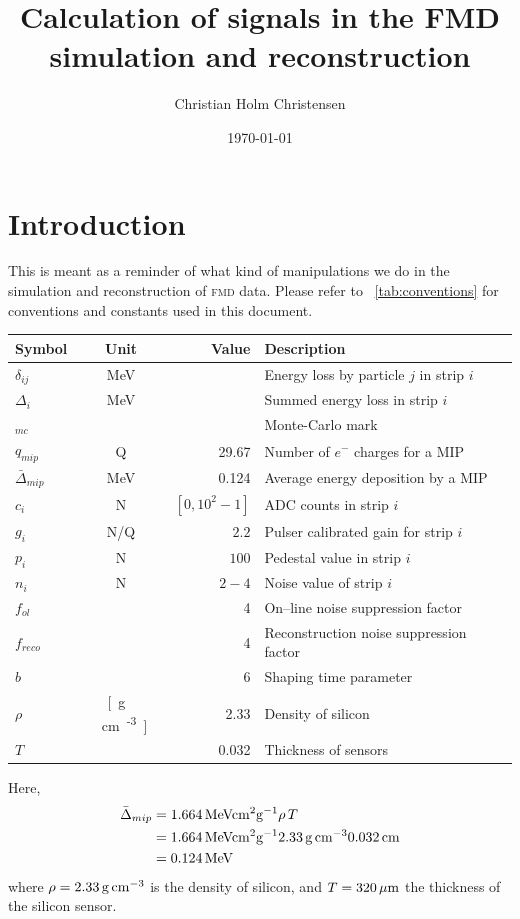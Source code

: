 \documentclass[11pt]{article}
\title{Calculation of signals in the FMD simulation and reconstruction}
\author{Christian Holm Christensen}
\date{\today}
\def\MeV#1{\unit[#1]{MeV}}
\def\N#1{\unit[#1]{N}}
\def\Q#1{\unit[#1]{Q}}
\def\FMD{{\scshape fmd}}
\def\DeltaMip{\ensuremath{\bar{\Delta}_{mip}}}
\begin{document}
\maketitle 

\section*{Introduction}

This is meant as a reminder of what kind of manipulations we do in the
simulation and reconstruction of \FMD{} data.   Please refer to
\tablename~\ref{tab:conventions} for conventions and constants used in
this document. 

\begin{table}[Htbp]
  \begingroup
  \centering
  \begin{tabular}{|l|c|r|p{}|}
    \hline
    \textbf{Symbol} & \textbf{Unit} & \textbf{Value} & \textbf{Description}\\
    \hline
    $\delta_{ij}$  & \MeV{}    &  & Energy loss by particle $j$ in strip $i$\\ 
    $\Delta_i$     & \MeV{}    &  & Summed energy loss in strip $i$\\
    ${}_{mc}$      &           &  & Monte-Carlo mark\\ 
    $q_{mip}$      & \Q{}       & 29.67 & Number of $e^-$ charges for a MIP\\
    $\DeltaMip{}$ & \MeV{}    & 0.124 & Average energy deposition by a MIP\\
    $c_i$          & \N{}      &  $[0,10^2-1]$ & ADC counts in strip $i$\\
    $g_i$          & \N{}/\Q{} & $~2.2$ & Pulser calibrated gain for strip $i$\\
    $p_i$          & \N{}      & $~100$ & Pedestal value in strip $i$\\
    $n_i$          & \N{}      & $2-4$ & Noise value of strip $i$\\
    $f_{ol}$       &           & 4 & On--line noise suppression factor\\
    $f_{reco}$     &            & 4 & Reconstruction noise suppression
    factor\\
    $b$           &           &  6 & Shaping time parameter\\
    $\rho$        & \unit[g\,cm\textsuperscript{-3}] & 2.33 & Density of silicon\\
    $T$           & \unit[cm] & 0.032 & Thickness of sensors\\
    \hline
  \end{tabular}
  \endgroup
  \vspace{1ex}
  \par
  \noindent Here, 
  \begin{align*}
    \DeltaMip{} &= \unit[1.664]{MeV cm^2 g^{-1}} \rho\,T\\
    &= \unit[1.664]{MeV cm^2 g^{-1}} \unit[2.33]{g\,cm^{-3}}
    \unit[0.032]{cm} \\
    &= \MeV{0.124}
  \end{align*}
  where $\rho=\unit[2.33]{g\,cm^{-3}}$ is the density of silicon, and
  $T=\unit[320]{\mu{}m}$ the thickness of the silicon sensor. 
  

\end{table}
\end{document}
